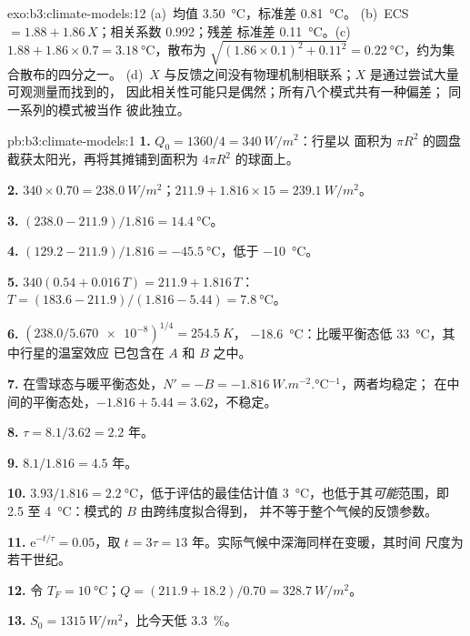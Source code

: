 \begin{solution}{exo:b3:climate-models:12}
(a)~均值 \qty{3.50}{\celsius}，标准差 \qty{0.81}{\celsius}。
(b)~ECS $= 1.88 + 1.86\,X$；相关系数 \num{0.992}；残差
标准差 \qty{0.11}{\celsius}。(c)~$1.88 + 1.86\times0.7 =
\qty{3.18}{\celsius}$，散布为 $\sqrt{(1.86\times0.1)^2 + 0.11^2} =
\qty{0.22}{\celsius}$，约为集合散布的四分之一。
(d)~$X$ 与反馈之间没有物理机制相联系；$X$ 是通过尝试大量可观测量而找到的，
因此相关性可能只是偶然；所有八个模式共有一种偏差；
同一系列的模式被当作
彼此独立。
\end{solution}

\begin{solution}{pb:b3:climate-models:1}
\textbf{1.} $Q_0 = 1360/4 = \qty{340}{W/m^2}$：行星以
面积为 $\pi R^2$ 的圆盘截获太阳光，再将其摊铺到面积为
$4\pi R^2$ 的球面上。

\textbf{2.} $340\times0.70 = \qty{238.0}{W/m^2}$；$211.9 + 1.816\times15 =
\qty{239.1}{W/m^2}$。

\textbf{3.} $(238.0 - 211.9)/1.816 = \qty{14.4}{\celsius}$。

\textbf{4.} $(129.2 - 211.9)/1.816 = \qty{-45.5}{\celsius}$，低于
\qty{-10}{\celsius}。

\textbf{5.} $340(0.54 + 0.016\,T) = 211.9 + 1.816\,T$：$T =
(183.6 - 211.9)/(1.816 - 5.44) = \qty{7.8}{\celsius}$。

\textbf{6.} $(238.0/\num{5.670e-8})^{1/4} = \qty{254.5}{K}$，
\qty{-18.6}{\celsius}：比暖平衡态低 \qty{33}{\celsius}，其中行星的温室效应
已包含在 $A$ 和 $B$ 之中。

\textbf{7.} 在雪球态与暖平衡态处，$N' = -B = \qty{-1.816}{W.m^{-2}.\celsius^{-1}}$，两者均稳定；
在中间的平衡态处，$-1.816 + 5.44 =
\num{+3.62}$，不稳定。

\textbf{8.} $\tau = 8.1/3.62 = \num{2.2}\text{ 年}$。

\textbf{9.} $8.1/1.816 = \num{4.5}\text{ 年}$。

\textbf{10.} $3.93/1.816 = \qty{2.2}{\celsius}$，低于评估的最佳估计值
\qty{3}{\celsius}，也低于其\emph{可能}范围，即 2.5 至
\qty{4}{\celsius}：模式的 $B$ 由跨纬度拟合得到，
并不等于整个气候的反馈参数。

\textbf{11.} $\mathrm e^{-t/\tau} = 0.05$，取 $t = 3\tau =
\num{13}\text{ 年}$。实际气候中深海同样在变暖，其时间
尺度为若干世纪。

\textbf{12.} 令 $T_F = \qty{10}{\celsius}$；$Q = (211.9 + 18.2)/0.70 =
\qty{328.7}{W/m^2}$。

\textbf{13.} $S_0 = \qty{1315}{W/m^2}$，比今天低 \qty{3.3}{\percent}。


\end{solution}
